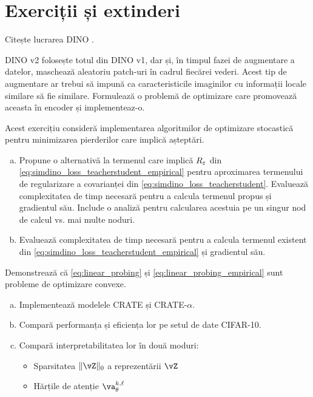 \documentclass[../../book-main_ro.tex]{subfiles}
\begin{document}
\section{Exerciții și extinderi}

\begin{exercise}
    Citește lucrarea DINO \cite{caron2021emerging}.
\end{exercise}

\begin{exercise}
    DINO v2 \cite{oquab2023dinov2} folosește totul din DINO v1, dar și, în timpul fazei de augmentare a datelor, maschează aleatoriu patch-uri în cadrul fiecărei vederi. Acest tip de augmentare ar trebui să impună ca caracteristicile imaginilor cu informații locale similare să fie similare. Formulează o problemă de optimizare care promovează aceasta în encoder și implementeaz-o.
\end{exercise}


\begin{exercise}
    Acest exercițiu consideră implementarea algoritmilor de optimizare stocastică pentru minimizarea pierderilor care implică așteptări.
    \begin{enumerate}[(a)]
        \item Propune o alternativă la termenul care implică \(R_{\varepsilon}\) din \eqref{eq:simdino_loss_teacherstudent_empirical} pentru aproximarea termenului de regularizare a covarianței din \eqref{eq:simdino_loss_teacherstudent}. Evaluează complexitatea de timp necesară pentru a calcula termenul propus și gradientul său. Include o analiză pentru calcularea acestuia pe un singur nod de calcul vs. mai multe noduri.
        \item Evaluează complexitatea de timp necesară pentru a calcula termenul existent din \eqref{eq:simdino_loss_teacherstudent_empirical} și gradientul său.
    \end{enumerate}
\end{exercise}

\begin{exercise}
    Demonstrează că \eqref{eq:linear_probing} și \eqref{eq:linear_probing_empirical} sunt probleme de optimizare convexe.
\end{exercise}

\begin{exercise}
    \phantom{}
    \begin{enumerate}[(a)]
        \item Implementează modelele CRATE și CRATE-\(\alpha\).
        \item Compară performanța și eficiența lor pe setul de date CIFAR-10.
        \item Compară interpretabilitatea lor în două moduri:
        \begin{itemize}
            \item Sparsitatea \(\norm{\vZ}_{0}\) a reprezentării \(\vZ\)
            \item Hărțile de atenție \(\va_{\theta}^{k, \ell}\)
        \end{itemize}
    \end{enumerate}
\end{exercise}
\end{document}

